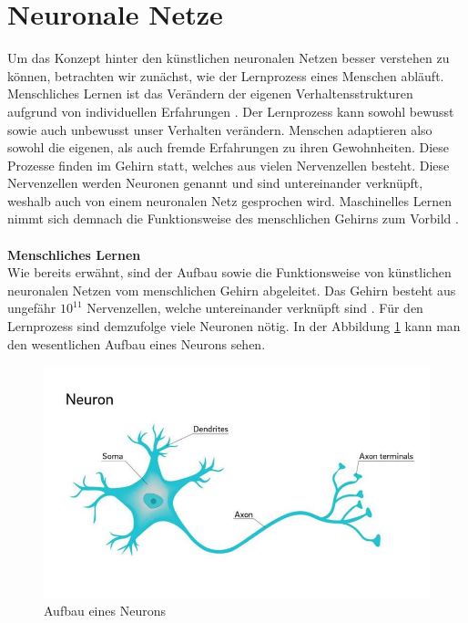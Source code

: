   \section{Neuronale Netze}\label{s.neuronalenetze}
Um das Konzept hinter den künstlichen neuronalen Netzen besser verstehen zu können, betrachten wir zunächst, wie der Lernprozess eines Menschen abläuft. Menschliches Lernen ist das Verändern der eigenen Verhaltensstrukturen aufgrund von individuellen Erfahrungen \cite{hoffmann2016lern}. Der Lernprozess kann sowohl bewusst sowie auch unbewusst unser Verhalten verändern. Menschen adaptieren also sowohl die eigenen, als auch fremde Erfahrungen zu ihren Gewohnheiten. Diese Prozesse finden im Gehirn statt, welches aus vielen Nervenzellen besteht. Diese Nervenzellen werden Neuronen genannt und sind untereinander verknüpft, weshalb auch von einem neuronalen Netz gesprochen wird. Maschinelles Lernen nimmt sich demnach die Funktionsweise des menschlichen Gehirns zum Vorbild \cite[]{ertel2013grundkurs}.\\\\
\textbf{Menschliches Lernen}\\
Wie bereits erwähnt, sind der Aufbau sowie die Funktionsweise von künstlichen neuronalen Netzen vom menschlichen Gehirn abgeleitet. Das Gehirn besteht aus ungefähr $10^{11}$ Nervenzellen, welche untereinander verknüpft sind \cite[265ff.]{ertel2013grundkurs}. Für den Lernprozess sind demzufolge viele Neuronen nötig. In der Abbildung \ref{img:neuron} kann man den wesentlichen Aufbau eines Neurons sehen.
\begin{figure}
	[h]
	\centering
	\includegraphics[scale=0.7]{Sources/neuron.jpg}
	\caption{Aufbau eines Neurons \cite{neuron2018UoC}}
	\label{img:neuron}
\end{figure}\\
